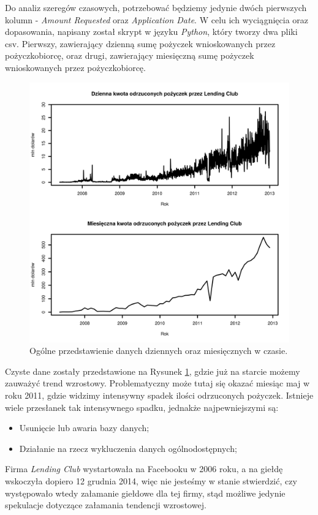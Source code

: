 \documentclass[11pt]{article}
\begin{document}
Do analiz szeregów czasowych, potrzebować będziemy jedynie dwóch pierwszych kolumn - \textit{Amount Requested} oraz \textit{Application Date}. W celu ich wyciągnięcia oraz dopasowania, napisany został skrypt w języku \textit{Python}, który tworzy dwa pliki csv. Pierwszy, zawierający dzienną sumę pożyczek wnioskowanych przez pożyczkobiorcę, oraz drugi, zawierający miesięczną sumę pożyczek wnioskowanych przez pożyczkobiorcę.

\begin{figure}[h]

    \centering
	\includegraphics[width=\textwidth]{images/data_ogolnie_ts.png}
    \caption{Ogólne przedstawienie danych dziennych oraz miesięcznych w czasie.}
    \label{fig:data_ogolnie_ts}

\end{figure}

\newpage

Czyste dane zostały przedstawione na Rysunek \ref{fig:data_ogolnie_ts}, gdzie już na starcie możemy zauważyć trend wzrostowy. Problematyczny może tutaj się okazać miesiąc maj w roku 2011, gdzie widzimy intensywny spadek ilości odrzuconych pożyczek. Istnieje wiele przesłanek tak intensywnego spadku, jednakże najpewniejszymi są:
\begin{itemize}
\item Usunięcie lub awaria bazy danych;
\item Działanie na rzecz wykluczenia danych ogólnodostępnych;
\end{itemize}
Firma \textit{Lending Club} wystartowała na Facebooku w 2006 roku, a na giełdę wskoczyła dopiero 12 grudnia 2014, więc nie jesteśmy w stanie stwierdzić, czy występowało wtedy załamanie giełdowe dla tej firmy, stąd możliwe jedynie spekulacje dotyczące załamania tendencji wzrostowej.
\end{document}
